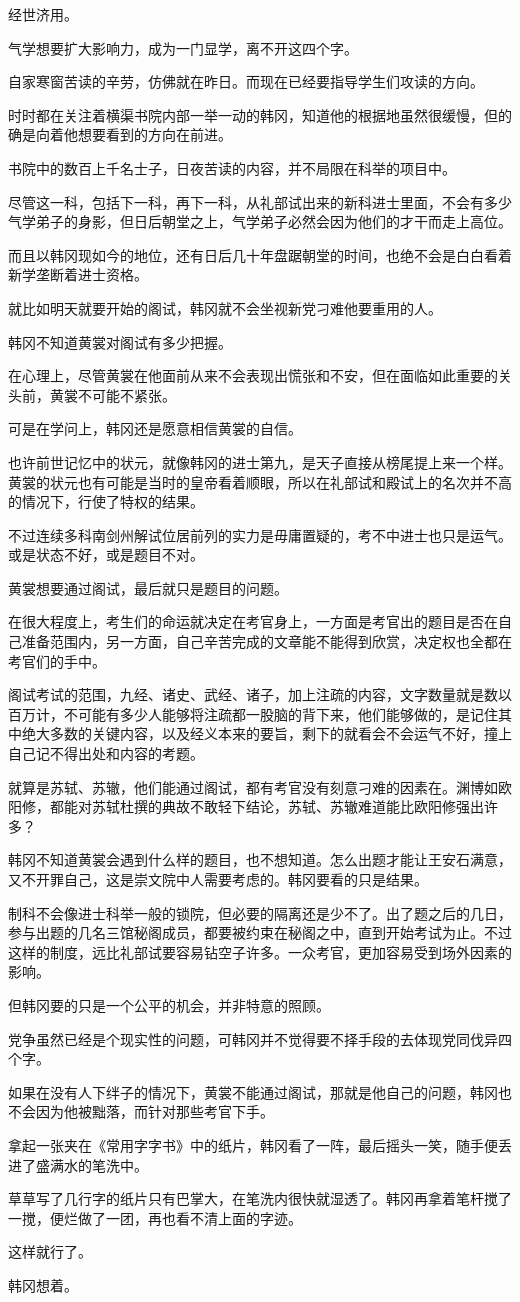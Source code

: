 经世济用。

气学想要扩大影响力，成为一门显学，离不开这四个字。

自家寒窗苦读的辛劳，仿佛就在昨日。而现在已经要指导学生们攻读的方向。

时时都在关注着横渠书院内部一举一动的韩冈，知道他的根据地虽然很缓慢，但的确是向着他想要看到的方向在前进。

书院中的数百上千名士子，日夜苦读的内容，并不局限在科举的项目中。

尽管这一科，包括下一科，再下一科，从礼部试出来的新科进士里面，不会有多少气学弟子的身影，但日后朝堂之上，气学弟子必然会因为他们的才干而走上高位。

而且以韩冈现如今的地位，还有日后几十年盘踞朝堂的时间，也绝不会是白白看着新学垄断着进士资格。

就比如明天就要开始的阁试，韩冈就不会坐视新党刁难他要重用的人。

韩冈不知道黄裳对阁试有多少把握。

在心理上，尽管黄裳在他面前从来不会表现出慌张和不安，但在面临如此重要的关头前，黄裳不可能不紧张。

可是在学问上，韩冈还是愿意相信黄裳的自信。

也许前世记忆中的状元，就像韩冈的进士第九，是天子直接从榜尾提上来一个样。黄裳的状元也有可能是当时的皇帝看着顺眼，所以在礼部试和殿试上的名次并不高的情况下，行使了特权的结果。

不过连续多科南剑州解试位居前列的实力是毋庸置疑的，考不中进士也只是运气。或是状态不好，或是题目不对。

黄裳想要通过阁试，最后就只是题目的问题。

在很大程度上，考生们的命运就决定在考官身上，一方面是考官出的题目是否在自己准备范围内，另一方面，自己辛苦完成的文章能不能得到欣赏，决定权也全都在考官们的手中。

阁试考试的范围，九经、诸史、武经、诸子，加上注疏的内容，文字数量就是数以百万计，不可能有多少人能够将注疏都一股脑的背下来，他们能够做的，是记住其中绝大多数的关键内容，以及经义本来的要旨，剩下的就看会不会运气不好，撞上自己记不得出处和内容的考题。

就算是苏轼、苏辙，他们能通过阁试，都有考官没有刻意刁难的因素在。渊博如欧阳修，都能对苏轼杜撰的典故不敢轻下结论，苏轼、苏辙难道能比欧阳修强出许多？

韩冈不知道黄裳会遇到什么样的题目，也不想知道。怎么出题才能让王安石满意，又不开罪自己，这是崇文院中人需要考虑的。韩冈要看的只是结果。

制科不会像进士科举一般的锁院，但必要的隔离还是少不了。出了题之后的几日，参与出题的几名三馆秘阁成员，都要被约束在秘阁之中，直到开始考试为止。不过这样的制度，远比礼部试要容易钻空子许多。一众考官，更加容易受到场外因素的影响。

但韩冈要的只是一个公平的机会，并非特意的照顾。

党争虽然已经是个现实性的问题，可韩冈并不觉得要不择手段的去体现党同伐异四个字。

如果在没有人下绊子的情况下，黄裳不能通过阁试，那就是他自己的问题，韩冈也不会因为他被黜落，而针对那些考官下手。

拿起一张夹在《常用字字书》中的纸片，韩冈看了一阵，最后摇头一笑，随手便丢进了盛满水的笔洗中。

草草写了几行字的纸片只有巴掌大，在笔洗内很快就湿透了。韩冈再拿着笔杆搅了一搅，便烂做了一团，再也看不清上面的字迹。

这样就行了。

韩冈想着。
